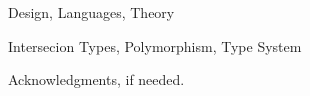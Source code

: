 \documentclass[times,10pt]{sigplanconf}
\begin{document}

\terms
Design, Languages, Theory

\keywords
Intersecion Types, Polymorphism, Type System










\appendix

% 

\acks

Acknowledgments, if needed.


\end{document}

